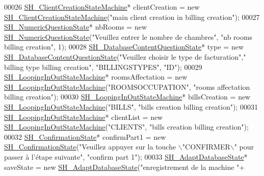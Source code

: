 \begin{DoxyCode}
00026     \hyperlink{classSH__ClientCreationStateMachine}{SH\_ClientCreationStateMachine}* clientCreation = \textcolor{keyword}{new} 
      \hyperlink{classSH__ClientCreationStateMachine}{SH\_ClientCreationStateMachine}(\textcolor{stringliteral}{"main client creation in billing creation"});
00027     \hyperlink{classSH__NumericQuestionState}{SH\_NumericQuestionState}* nbRooms = \textcolor{keyword}{new} 
      \hyperlink{classSH__NumericQuestionState}{SH\_NumericQuestionState}(\textcolor{stringliteral}{"Veuillez entrer le nombre de chambres"}, \textcolor{stringliteral}{"nb rooms billing
       creation"}, 1);
00028     \hyperlink{classSH__DatabaseContentQuestionState}{SH\_DatabaseContentQuestionState}* type = \textcolor{keyword}{new} 
      \hyperlink{classSH__DatabaseContentQuestionState}{SH\_DatabaseContentQuestionState}(\textcolor{stringliteral}{"Veuillez choisir le type de facturation"},\textcolor{stringliteral}{"
      billing type billing creation"}, \textcolor{stringliteral}{"BILLINGSTYPES"}, \textcolor{stringliteral}{"ID"});
00029     \hyperlink{classSH__LoopingInOutStateMachine}{SH\_LoopingInOutStateMachine}* roomsAffectation = \textcolor{keyword}{new} 
      \hyperlink{classSH__LoopingInOutStateMachine}{SH\_LoopingInOutStateMachine}(\textcolor{stringliteral}{"ROOMSOCCUPATION"}, \textcolor{stringliteral}{"rooms affectation billing
       creation"});
00030     \hyperlink{classSH__LoopingInOutStateMachine}{SH\_LoopingInOutStateMachine}* billsCreation = \textcolor{keyword}{new} 
      \hyperlink{classSH__LoopingInOutStateMachine}{SH\_LoopingInOutStateMachine}(\textcolor{stringliteral}{"BILLS"}, \textcolor{stringliteral}{"bills creation billing creation"});
00031     \hyperlink{classSH__LoopingInOutStateMachine}{SH\_LoopingInOutStateMachine}* clientList = \textcolor{keyword}{new} 
      \hyperlink{classSH__LoopingInOutStateMachine}{SH\_LoopingInOutStateMachine}(\textcolor{stringliteral}{"CLIENTS"}, \textcolor{stringliteral}{"bills creation billing creation"});
00032     \hyperlink{classSH__ConfirmationState}{SH\_ConfirmationState}* confirmPart1 = \textcolor{keyword}{new} 
      \hyperlink{classSH__ConfirmationState}{SH\_ConfirmationState}(\textcolor{stringliteral}{"Veuillez appuyer sur la touche \(\backslash\)"CONFIRMER\(\backslash\)" pour passer à
       l'étape suivante"}, \textcolor{stringliteral}{"confirm part 1"});
00033     \hyperlink{classSH__AdaptDatabaseState}{SH\_AdaptDatabaseState}* saveState = \textcolor{keyword}{new} 
      \hyperlink{classSH__AdaptDatabaseState}{SH\_AdaptDatabaseState}(\textcolor{stringliteral}{"enregistrement de la machine "}+

\end{DoxyCode}
